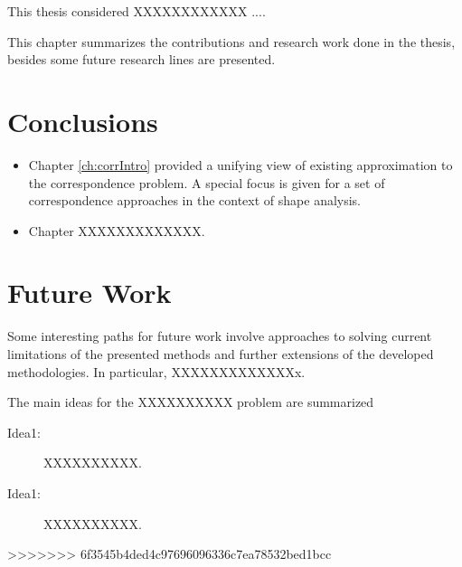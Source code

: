 This thesis considered XXXXXXXXXXXX  ....

This chapter summarizes the contributions and research work done in the thesis, besides some future research lines are presented.

\section{Conclusions}

\begin{itemize}
	\item Chapter \ref{ch:corrIntro} provided a unifying view of existing approximation to the correspondence problem. A special focus
	is given for a set of correspondence approaches in the context of shape analysis.

\item Chapter XXXXXXXXXXXXX.
 
\end{itemize}


\section{Future Work}

Some interesting paths for future work involve approaches to solving current limitations of the presented methods and further extensions of the developed methodologies. In particular, XXXXXXXXXXXXXx.

The main ideas for the XXXXXXXXXX problem are summarized

\begin{description}
	\item[Idea1:] XXXXXXXXXX.
	
		\item[Idea1:] XXXXXXXXXX.
\end{description}





>>>>>>> 6f3545b4ded4c97696096336c7ea78532bed1bcc
\outbpdocument{}